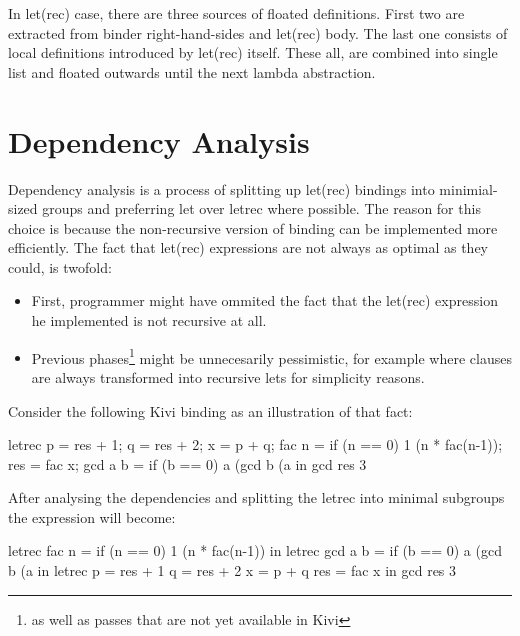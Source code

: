 \documentclass[12pt,a4paper]{report}
\begin{document}
In let(rec) case, there are three sources of floated definitions. First two are
extracted from binder right-hand-sides and let(rec) body. The last one consists
of local definitions introduced by let(rec) itself. These all, are combined into
single list and floated outwards until the next lambda abstraction.

\section{Dependency Analysis}
Dependency analysis is a process of splitting up let(rec) bindings
into minimial-sized groups and preferring let over letrec
where possible. The reason for this choice is because the non-recursive version
of binding can be implemented more efficiently. The fact that let(rec)
expressions are not always as optimal as they could, is twofold:
\begin{itemize}
  \item First, programmer might have ommited the fact that the
    let(rec) expression he implemented is not recursive at all.
  \item Previous phases\footnote{as well as passes that are not yet available
    in Kivi} might be unnecesarily pessimistic, for example where
    clauses are always transformed into recursive lets for simplicity
    reasons.
\end{itemize}
Consider the following Kivi binding as an illustration of that fact:

\vspace*{0.2in}
\begin{code}[style=haskell,label=lst:letrec_dependency_example,caption={Example of
  letrec before dependency analysis.}]
letrec
    p       = res + 1;
    q       = res + 2;
    x       = p + q;
    fac n   = if (n == 0) 1 (n * fac(n-1));
    res     = fac x;
    gcd a b = if (b == 0) a (gcd b (a %
in
    gcd res 3
\end{code}

After analysing the dependencies and splitting the letrec into minimal
subgroups the expression will become:

\vspace*{0.2in}
\begin{code}[style=haskell,label=lst:letrec_after_anlysis,caption={letrec
  after performing dependency anlysis.}]
letrec
    fac n = if (n == 0) 1 (n * fac(n-1))
in letrec
    gcd a b = if (b == 0) a (gcd b (a %
in letrec
    p = res + 1
    q = res + 2
    x = p + q
    res = fac x
in
    gcd res 3
\end{code}
\end{document}
